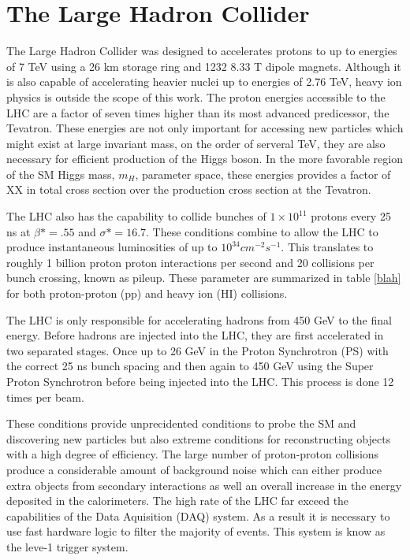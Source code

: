 \chapter{The Large Hadron Collider}
\label{sec:LHC}

The Large Hadron Collider was designed to accelerates protons to up to 
energies of 7 TeV using a 26 km storage ring and  1232  8.33 T dipole magnets. 
Although it is also capable of accelerating heavier nuclei up to energies of 
2.76 TeV, heavy ion physics is outside the scope of this work.  The proton
energies accessible to the LHC are a factor of seven times higher than its
most advanced predicessor, the Tevatron.  These energies are not only 
important for accessing new particles which might exist at large invariant
mass, on the order of serveral TeV, they are also necessary for efficient 
production of the Higgs boson.  In the more favorable region of the SM 
Higgs mass,  $m_{H}$, parameter space, these energies provides a 
factor of XX in total cross section over the production cross section at
the Tevatron.  

The LHC also has the capability to collide bunches of $1\times10^11$
protons every 25 ns at $\beta*=.55$ and $\sigma*=16.7$.  These 
conditions combine to allow the LHC to produce instantaneous luminosities 
of up to $10^34 cm^{-2}s^{-1}$.  This translates to roughly 1 billion proton
proton interactions per second and 20 collisions per bunch crossing, known
as pileup.  These
parameter are summarized in table \ref{blah} for both proton-proton (pp)
and heavy ion (HI) collisions. 

The LHC is only responsible for accelerating hadrons from 450 GeV to the 
final energy.  Before hadrons are injected into the LHC, they are first 
accelerated in two separated stages.  Once up to 26 GeV in the Proton
Synchrotron (PS) with the correct 25 ns bunch spacing and then again
to 450 GeV using  the Super Proton Synchrotron before being injected 
into the LHC.  This process is done 12 times per beam.  

These conditions provide unprecidented conditions to probe the SM and 
discovering new particles but also extreme conditions for reconstructing
objects with a high degree of efficiency.  The large number of proton-proton
collisions produce a considerable amount of background noise which can 
either produce extra objects from secondary interactions as well an overall
increase in the energy deposited in the calorimeters.  The  high rate of the 
LHC far exceed the capabilities of the Data Aquisition (DAQ) system.  As a 
result it is necessary to use fast hardware logic to filter the majority of events. 
This system is know as the leve-1 trigger system.  

